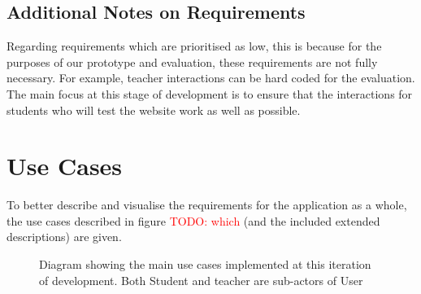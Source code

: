 \documentclass[a4paper,11pt]{report}
\newcommand{\todo}[1]{\textcolor{red}{TODO: #1}}
\begin{document}
\subsection{Additional Notes on Requirements}
Regarding requirements which are prioritised as low, this is because for the purposes of our prototype and evaluation, these requirements are not fully necessary. For example, teacher interactions can be hard coded for the evaluation. The main focus at this stage of development is to ensure that the interactions for students who will test the website work as well as possible.

\section{Use Cases}
To better describe and visualise the requirements for the application as a whole, the use cases described in figure \todo{which} (and the included extended descriptions) are given.
\begin{figure}[ht]
\centering
{}
\caption{Diagram showing the main use cases implemented at this iteration of development. Both Student and teacher are sub-actors of User}
\label{fig:i1uc}
\end{figure}

\singlespacing
\end{document}
